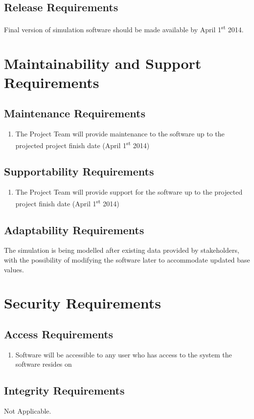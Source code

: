 \documentclass[paper=letter, fontsize=10pt]{scrartcl}
\numberwithin{equation}{section}		%
\numberwithin{figure}{section}			%
\numberwithin{table}{section}				%
\newcommand{\ts}{\textsuperscript}
\begin{document}
\subsection{Release Requirements}
Final version of simulation software should be made available by April 1\ts{st} 2014.

\section{Maintainability and Support Requirements}
\subsection{Maintenance Requirements}
	\begin{enumerate}
		\item The Project Team will provide maintenance to the software up to the projected project finish date (April 1\ts{st} 2014)
	\end{enumerate}
\subsection{Supportability Requirements}
	\begin{enumerate}
		\item The Project Team will provide support for the software up to the projected project finish date (April 1\ts{st} 2014)
	\end{enumerate}
\subsection{Adaptability Requirements}
The simulation is being modelled after existing data provided by stakeholders, with the possibility of modifying the software later to accommodate updated base values. 

\section{Security Requirements}
\subsection{Access Requirements}
	\begin{enumerate}
		\item Software will be accessible to any user who has access to the system the software resides on
	\end{enumerate}
\subsection{Integrity Requirements}
Not Applicable.
\end{document}
